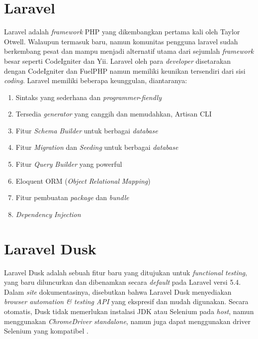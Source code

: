 	 \section{Laravel}
	 Laravel adalah \textit{framework} PHP yang dikembangkan pertama kali oleh Taylor Otwell. Walaupun termasuk baru, namun komunitas pengguna laravel sudah berkembang pesat dan mampu menjadi alternatif utama dari sejumlah \textit{framework} besar seperti CodeIgniter dan Yii. Laravel oleh para \textit{developer} disetarakan dengan CodeIgniter dan FuelPHP namun memiliki keunikan tersendiri dari sisi \textit{coding}. Laravel memiliki beberapa keunggulan, diantaranya:
	 \begin{enumerate}
	    	\item Sintaks yang sederhana dan \textit{programmer}-\textit{fiendly}
	    	\item Tersedia \textit{generator} yang canggih dan memudahkan, Artisan CLI
	    	\item Fitur \textit{Schema} \textit{Builder} untuk berbagai \textit{database}
	    	\item Fitur \textit{Migration} dan \textit{Seeding} untuk berbagai \textit{database}
	    	\item Fitur \textit{Query} \textit{Builder} yang powerful
	    	\item Eloquent ORM (\textit{Object} \textit{Relational} \textit{Mapping})
	    	\item Fitur pembuatan \textit{package} dan \textit{bundle}
	    	\item \textit{Dependency} \textit{Injection} \cite{noauthor_apa_2016}
	 \end{enumerate}
	 
	 
	\section{Laravel Dusk}
	Laravel Dusk adalah sebuah fitur baru yang ditujukan untuk \textit{functional testing}, yang baru diluncurkan dan dibenamkan secara \textit{default} pada Laravel versi 5.4. Dalam \textit{site} dokumentasinya, disebutkan bahwa Laravel Dusk menyediakan \textit{browser automation \& testing API} yang ekspresif dan mudah digunakan. Secara otomatis, Dusk tidak memerlukan instalasi JDK atau Selenium pada \textit{host}, namun menggunakan \textit{ChromeDriver standalone}, namun juga dapat menggunakan driver Selenium yang kompatibel \cite{laravel_browser_nodate}.
	     
	     
	  
